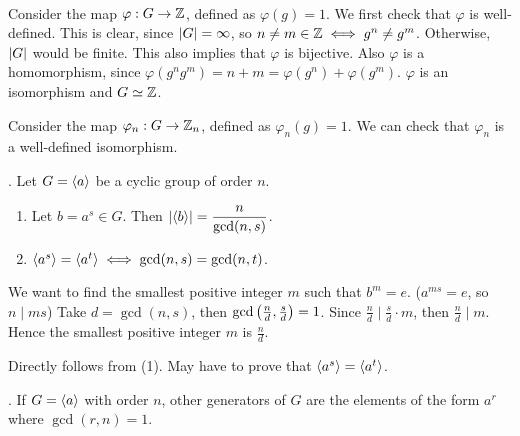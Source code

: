 \pf \\
 Consider the map \(\varphi: G \rightarrow \mathbb{Z}\), defined as \(\varphi(g) = 1\). We first check that \(\varphi\) is well-defined. This is clear, since \(\left| G \right| = \infty\), so \(n \neq m \in \mathbb{Z} \iff g^n \neq g^m\). Otherwise, \(\left| G \right|\) would be finite. This also implies that \(\varphi\) is bijective. Also \(\varphi\) is a homomorphism, since \(\varphi(g^n g^m) = n + m = \varphi(g^n) + \varphi(g^m)\). \(\varphi\) is an isomorphism and \(G \simeq \mathbb{Z}\).

 Consider the map \(\varphi_n: G \rightarrow \mathbb{Z}_n\), defined as \(\varphi_n(g) = 1\). We can check that \(\varphi_n\) is a well-defined isomorphism.

\thm. Let \(G = \left\langle a \right\rangle\) be a cyclic group of order \(n\).
\begin{enumerate}
    \item Let \(b = a^s \in G\). Then \(\left| \left\langle b \right\rangle \right| = \dfrac{n}{\gcd(n, s)}\).
    \item \(\left\langle a^s \right\rangle = \left\langle a^t \right\rangle \iff \gcd(n, s) = \gcd(n, t)\).
\end{enumerate}

\pf
{} We want to find the smallest positive integer \(m\) such that \(b^m = e\). (\(a^{ms} = e\), so \(n \mid ms\)) Take \(d = \gcd(n, s)\), then \(\gcd\left( \frac{n}{d}, \frac{s}{d} \right) = 1\). Since \(\frac{n}{d} \mid \frac{s}{d}\cdot m\), then \(\frac{n}{d} \mid m\). Hence the smallest positive integer \(m\) is \(\frac{n}{d}\).

 Directly follows from (1). May have to prove that \(\left\langle a^s \right\rangle = \left\langle a^t \right\rangle\).

\cor. If \(G = \left\langle a \right\rangle\) with order \(n\), other generators of \(G\) are the elements of the form \(a^r\) where \(\gcd(r, n) = 1\).

\pagebreak
